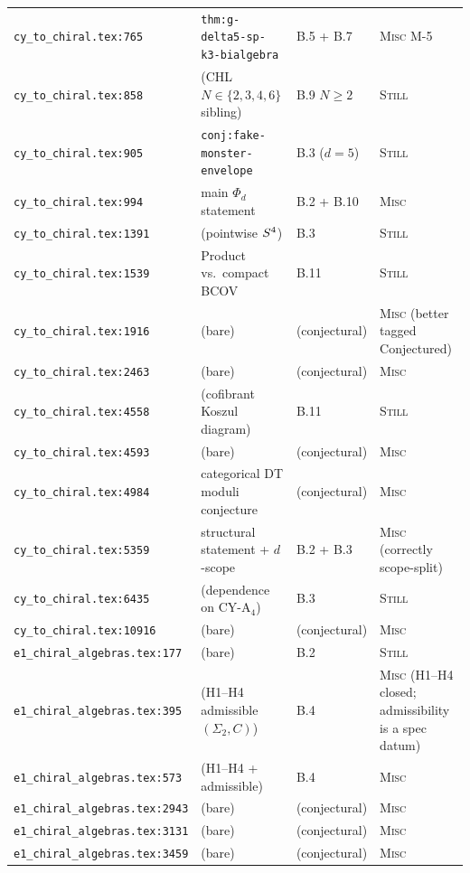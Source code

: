 \documentclass[11pt]{amsart}
\begin{document}
{{\begin{longtable}{@{}p{5.5cm}p{3cm}p{2cm}p{3.5cm}@{}}
\texttt{cy\_to\_chiral.tex:765} & \texttt{thm:g-delta5-sp-k3-bialgebra} & B.5 + B.7 & \textsc{Misc} M-5 \\
\texttt{cy\_to\_chiral.tex:858} & (CHL $N \in \{2,3,4,6\}$ sibling) & B.9 $N\geq 2$ & \textsc{Still} \\
\texttt{cy\_to\_chiral.tex:905} & \texttt{conj:fake-monster-envelope} & B.3 ($d=5$) & \textsc{Still} \\
\texttt{cy\_to\_chiral.tex:994} & main $\Phi_d$ statement & B.2 + B.10 & \textsc{Misc} \\
\texttt{cy\_to\_chiral.tex:1391} & (pointwise $S^4$) & B.3 & \textsc{Still} \\
\texttt{cy\_to\_chiral.tex:1539} & Product vs.\ compact BCOV & B.11 & \textsc{Still} \\
\texttt{cy\_to\_chiral.tex:1916} & (bare) & (conjectural) & \textsc{Misc} (better tagged Conjectured) \\
\texttt{cy\_to\_chiral.tex:2463} & (bare) & (conjectural) & \textsc{Misc} \\
\texttt{cy\_to\_chiral.tex:4558} & (cofibrant Koszul diagram) & B.11 & \textsc{Still} \\
\texttt{cy\_to\_chiral.tex:4593} & (bare) & (conjectural) & \textsc{Misc} \\
\texttt{cy\_to\_chiral.tex:4984} & categorical DT moduli conjecture & (conjectural) & \textsc{Misc} \\
\texttt{cy\_to\_chiral.tex:5359} & structural statement + $d$-scope & B.2 + B.3 & \textsc{Misc} (correctly scope-split) \\
\texttt{cy\_to\_chiral.tex:6435} & (dependence on CY-A$_4$) & B.3 & \textsc{Still} \\
\texttt{cy\_to\_chiral.tex:10916} & (bare) & (conjectural) & \textsc{Misc} \\
\texttt{e1\_chiral\_algebras.tex:177} & (bare) & B.2 & \textsc{Still} \\
\texttt{e1\_chiral\_algebras.tex:395} & (H1--H4 admissible $(\Sigma_2,C)$) & B.4 & \textsc{Misc} (H1--H4 closed; admissibility is a spec datum) \\
\texttt{e1\_chiral\_algebras.tex:573} & (H1--H4 + admissible) & B.4 & \textsc{Misc} \\
\texttt{e1\_chiral\_algebras.tex:2943} & (bare) & (conjectural) & \textsc{Misc} \\
\texttt{e1\_chiral\_algebras.tex:3131} & (bare) & (conjectural) & \textsc{Misc} \\
\texttt{e1\_chiral\_algebras.tex:3459} & (bare) & (conjectural) & \textsc{Misc} \\

\end{longtable}}}
\end{document}
